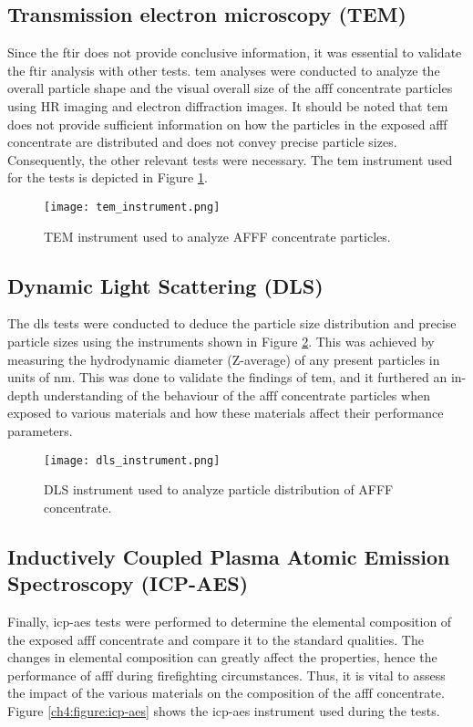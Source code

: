 \subsection{Transmission electron microscopy (TEM)}
Since the \acrshort{ftir} does not provide conclusive information, it was essential to validate the \acrshort{ftir} analysis with other tests. \acrshort{tem} analyses were conducted to analyze the overall particle shape and the visual overall size of the \acrshort{afff} concentrate particles using HR imaging and electron diffraction images. It should be noted that \acrshort{tem} does not provide sufficient information on how the particles in the exposed \acrshort{afff} concentrate are distributed and does not convey precise particle sizes. Consequently, the other relevant tests were necessary. The \acrshort{tem} instrument used for the tests is depicted in Figure \ref{ch4:figure:tem}.
 
\begin{figure}[H]
    \centering
    \texttt{[image: tem\_instrument.png]}
    \caption{TEM instrument used to analyze AFFF concentrate particles.}
    \label{ch4:figure:tem}
\end{figure}

\subsection{Dynamic Light Scattering (DLS)}
The \acrshort{dls} tests were conducted to deduce the particle size distribution and precise particle sizes using the instruments shown in Figure \ref{ch4:figure:dls}. This was achieved by measuring the hydrodynamic diameter (Z-average) of any present particles in units of nm. This was done to validate the findings of \acrshort{tem}, and it furthered an in-depth understanding of the behaviour of the \acrshort{afff} concentrate particles when exposed to various materials and how these materials affect their performance parameters.
 
\begin{figure}[H]
    \centering
    \texttt{[image: dls\_instrument.png]}
    \caption{DLS instrument used to analyze particle distribution of AFFF concentrate.}
    \label{ch4:figure:dls}
\end{figure}

\subsection{Inductively Coupled Plasma Atomic Emission Spectroscopy (ICP-AES)}
Finally, \acrshort{icp-aes} tests were performed to determine the elemental composition of the exposed \acrshort{afff} concentrate and compare it to the standard qualities. The changes in elemental composition can greatly affect the properties, hence the performance of \acrshort{afff} during firefighting circumstances. Thus, it is vital to assess the impact of the various materials on the composition of the \acrshort{afff} concentrate. Figure \ref{ch4:figure:icp-aes} shows the \acrshort{icp-aes} instrument used during the tests.
 

